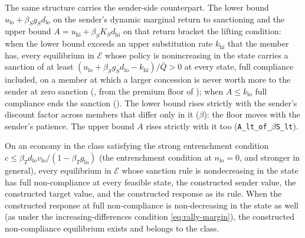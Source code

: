 The same structure carries the sender-side counterpart. The lower bound
$u_{\mathrm{lo}}+\beta_Sg_Sd_{\mathrm{lo}}$ on the sender's dynamic marginal return to
sanctioning and the upper bound
$A=u_{\mathrm{hi}}+\beta_SK_Sd_{\mathrm{hi}}$ on that return bracket the lifting condition: when the lower
bound exceeds an upper substitution rate $k_{\mathrm{hi}}$ that the member
has, every equilibrium in $\mathcal E$ whose policy is
nonincreasing in the state carries a sanction of at least
$(u_{\mathrm{lo}}+\beta_Sg_Sd_{\mathrm{lo}}-k_{\mathrm{hi}})/\bar Q>0$ at every state,
full compliance included, on a member at which a larger concession is never
worth more to the sender at zero sanction
(, from the premium floor of
); when $A\le k_{\mathrm{lo}}$ full
compliance ends the sanction (). The lower bound rises
strictly with the sender's discount factor across members that differ only in
it ($\beta$): the floor moves with the sender's
patience. The upper bound $A$ rises strictly with it too
(\texttt{A\_lt\_of\_$\beta$S\_lt}).

\begin{proposition}
\label{prop:monotone-uniqueness}
On an economy in the class satisfying the strong entrenchment condition
$c\le\beta_Td_{\mathrm{lo}}v_{\mathrm{lo}}/(1-\beta_Tg_{\mathrm{lo}})$ (the entrenchment condition
at $n_{\mathrm{lo}}=0$, and stronger in general), every equilibrium in $\mathcal E$ whose
sanction rule is nondecreasing in the state has full non-compliance at every
feasible state,
the constructed sender value, the constructed target value, and the
constructed response as its rule. When the constructed response at full
non-compliance is non-decreasing in the state as well (as under the increasing-differences
condition \eqref{eq:rally-margin}), the constructed non-compliance equilibrium exists and
belongs to the class.
\end{proposition}

